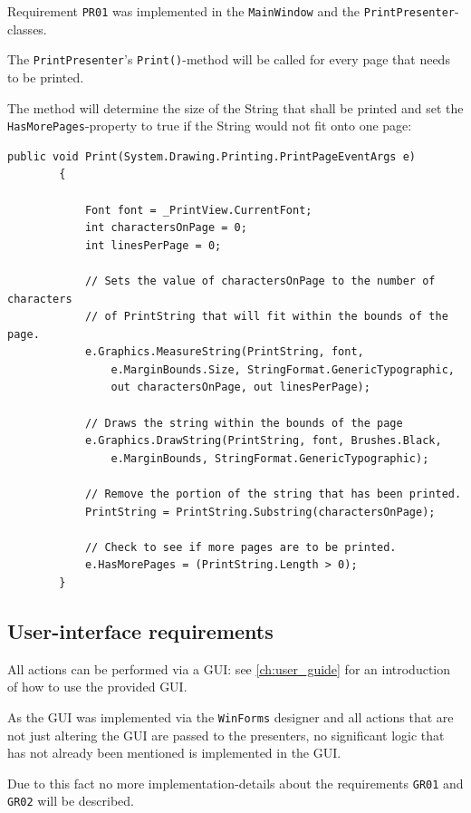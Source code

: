 Requirement \texttt{PR01} was implemented in the \texttt{MainWindow} and the \texttt{PrintPresenter}-classes.

The \texttt{PrintPresenter}'s \texttt{Print()}-method will be called for every page that needs to be printed.

The method will determine the size of the String that shall be printed and set the \texttt{HasMorePages}-property to true if the String would not fit onto one page:

\begin{lstlisting}
public void Print(System.Drawing.Printing.PrintPageEventArgs e)
        {
            
            Font font = _PrintView.CurrentFont;
            int charactersOnPage = 0;
            int linesPerPage = 0;

            // Sets the value of charactersOnPage to the number of characters 
            // of PrintString that will fit within the bounds of the page.
            e.Graphics.MeasureString(PrintString, font,
                e.MarginBounds.Size, StringFormat.GenericTypographic,
                out charactersOnPage, out linesPerPage);

            // Draws the string within the bounds of the page
            e.Graphics.DrawString(PrintString, font, Brushes.Black,
                e.MarginBounds, StringFormat.GenericTypographic);

            // Remove the portion of the string that has been printed.
            PrintString = PrintString.Substring(charactersOnPage);

            // Check to see if more pages are to be printed.
            e.HasMorePages = (PrintString.Length > 0);
        }
\end{lstlisting}

\subsection{User-interface requirements}

All actions can be performed via a \ac{GUI}: see \autoref{ch:user_guide} for an introduction of how to use the provided \ac{GUI}.

As the \ac{GUI} was implemented via the \texttt{WinForms} designer and all actions that are not just altering the \ac{GUI} are passed to the presenters, no significant logic that has not already been mentioned is implemented in the \ac{GUI}.

Due to this fact no more implementation-details about the requirements \texttt{GR01} and \texttt{GR02} will be described.

